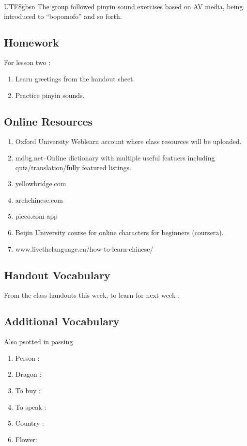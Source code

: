 \documentclass{article}
\newcommand{\myfont}{gbsn} %
\begin{document}
\begin{CJK}{UTF8}{\myfont}
The group followed pinyin sound exercises based on AV media, being introduced to ``bopomofo'' and so forth.

\subsection{Homework}

For lesson two :

\begin{enumerate}
\item Learn greetings from the handout sheet.
\item Practice pinyin sounds.
\end{enumerate}

\subsection{Online Resources}

\begin{enumerate}
\item Oxford University Weblearn account where class resources will be uploaded.
\item mdbg.net--Online dictionary with multiple useful featuers including quiz/translation/fully featured listings.
\item yellowbridge.com
\item archchinese.com
\item pieco.com app
\item Beijin University course for online characters for beginners (coursera).
\item www.livethelanguage.cn/how-to-learn-chinese/
\end{enumerate}

\subsection{Handout Vocabulary}

From the class handouts this week, to learn for next week :


\subsection{Additional Vocabulary}

Also psotted in passing

\begin{enumerate}
\item Person : 
\item Dragon : \xpinyin*{}
\item To buy :\xpinyin*{}
\item To speak : \xpinyin*{}
\item Country : 
\item Flower: 
\end{enumerate}


\end{CJK}
\end{document}
